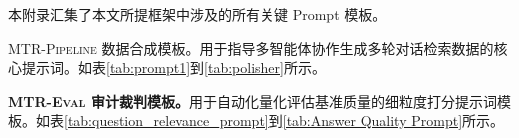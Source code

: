 本附录汇集了本文所提框架中涉及的所有关键 Prompt 模板。

\textsc{MTR-Pipeline} 数据合成模板。用于指导多智能体协作生成多轮对话检索数据的核心提示词。如表\ref{tab:prompt1}到\ref{tab:polisher}所示。

\textbf{\textsc{MTR-Eval} 审计裁判模板。}用于自动化量化评估基准质量的细粒度打分提示词模板。如表\ref{tab:question_relevance_prompt}到\ref{tab:Answer Quality Prompt}所示。
\begin{table}[!htbp]
\small


    \label{tab:prompt1}
\end{table}
\begin{table}
\small

    \label{tab:prompt2}
    
\end{table}


\begin{table}[!htbp]
\small

    \label{tab:polisher}
\end{table}

\begin{table}[!htbp]
\small

    \label{tab:question_relevance_prompt}
\end{table}

\begin{table}[!htbp]
\small

    \label{tab:Annotation Correctness Prompt}
\end{table}



\begin{table}[!htbp]
\small

    \label{tab:RESPONSE_FAITHFUL}
\end{table}



\begin{table}[!htbp]
\small
{}

    \label{tab:Answer Quality Prompt}
\end{table}



